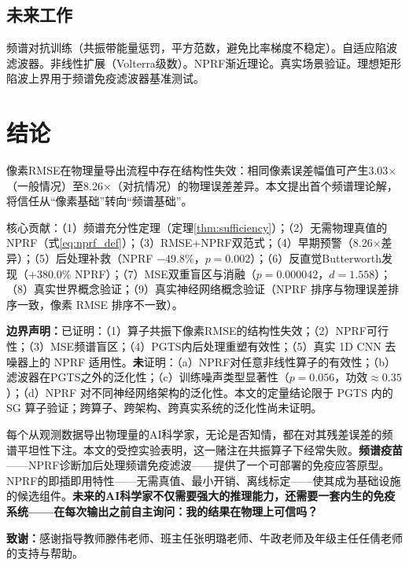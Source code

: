 \documentclass[9pt,twocolumn]{article}
\theoremstyle{remark}
\theoremstyle{definition}
\newcommand{\澔}{%
  \hbox{%
    \scalebox{0.75}[1]{氵}%
    \kern -0.3em%
    \scalebox{0.8}[1]{皓}%
  }%
}
\begin{document}
\subsection{未来工作}

频谱对抗训练（共振带能量惩罚，平方范数，避免比率梯度不稳定）。自适应陷波滤波器。非线性扩展（Volterra级数）。NPRF渐近理论。真实场景验证。理想矩形陷波上界用于频谱免疫滤波器基准测试。

\section{结论}

像素RMSE在物理量导出流程中存在结构性失效：相同像素误差幅值可产生3.03$\times$（一般情况）至8.26$\times$（对抗情况）的物理误差差异。本文提出首个频谱理论解，将信任从“像素基础”转向“频谱基础”。

核心贡献：（1）频谱充分性定理（定理\ref{thm:sufficiency}）；（2）无需物理真值的NPRF（式\ref{eq:nprf_def}）；（3）RMSE+NPRF双范式；（4）早期预警（8.26$\times$差异）；（5）后处理补救（NPRF $-49.8\%$，$p=0.002$）；（6）反直觉Butterworth发现（+380.0\% NPRF）；（7）MSE双重盲区与消融（$p=0.000042$，$d=1.558$）；（8）真实世界概念验证；（9）真实神经网络概念验证（NPRF 排序与物理误差排序一致，像素 RMSE 排序不一致）。

\begingroup
\scriptsize
\textbf{边界声明：}已证明：（1）算子共振下像素RMSE的结构性失效；（2）NPRF可行性；（3）MSE频谱盲区；（4）PGTS内后处理重塑有效性；（5）真实 1D CNN 去噪器上的 NPRF 适用性。\textbf{未}证明：（a）NPRF对任意非线性算子的有效性；（b）滤波器在PGTS之外的泛化性；（c）训练噪声类型显著性（$p=0.056$，功效$\approx0.35$）；（d）NPRF 对不同神经网络架构的泛化性。本文的定量结论限于 PGTS 内的 SG 算子验证；跨算子、跨架构、跨真实系统的泛化性尚未证明。

\endgroup

\vspace{1pt}

每个从观测数据导出物理量的AI科学家，无论是否知情，都在对其残差误差的频谱平坦性下注。本文的受控实验表明，这一赌注在共振算子下经常失败。\textbf{频谱疫苗}——NPRF诊断加后处理频谱免疫滤波——提供了一个可部署的免疫应答原型。NPRF的即插即用特性——无需真值、最小开销、离线标定——使其成为基础设施的候选组件。\textbf{未来的AI科学家不仅需要强大的推理能力，还需要一套内生的免疫系统——在每次输出之前自主询问：我的结果在物理上可信吗？}

\vspace{1pt}
{\scriptsize\noindent\textbf{致谢：}感谢指导教师滕伟老师、班主任张明璐老师、牛政老师及年级主任任倩老师的支持与帮助。}
\end{document}
